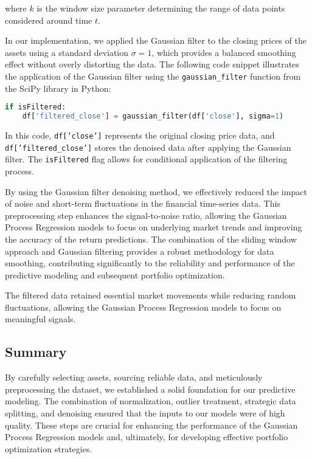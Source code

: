 where $k$ is the window size parameter determining the range of data points considered around time $t$.

In our implementation, we applied the Gaussian filter to the closing prices of the assets using a standard deviation $\sigma = 1$, which provides a balanced smoothing effect without overly distorting the data. The following code snippet illustrates the application of the Gaussian filter using the \texttt{gaussian\_filter} function from the SciPy library in Python:

\begin{lstlisting}[language=Python]
if isFiltered:
    df['filtered_close'] = gaussian_filter(df['close'], sigma=1)
\end{lstlisting}

In this code, \texttt{df['close']} represents the original closing price data, and \texttt{df['filtered\_close']} stores the denoised data after applying the Gaussian filter. The \texttt{isFiltered} flag allows for conditional application of the filtering process.

By using the Gaussian filter denoising method, we effectively reduced the impact of noise and short-term fluctuations in the financial time-series data. This preprocessing step enhances the signal-to-noise ratio, allowing the Gaussian Process Regression models to focus on underlying market trends and improving the accuracy of the return predictions. The combination of the sliding window approach and Gaussian filtering provides a robust methodology for data smoothing, contributing significantly to the reliability and performance of the predictive modeling and subsequent portfolio optimization.

The filtered data retained essential market movements while reducing random fluctuations, allowing the Gaussian Process Regression models to focus on meaningful signals.


\subsection{Summary}

By carefully selecting assets, sourcing reliable data, and meticulously preprocessing the dataset, we established a solid foundation for our predictive modeling. The combination of normalization, outlier treatment, strategic data splitting, and denoising ensured that the inputs to our models were of high quality. These steps are crucial for enhancing the performance of the Gaussian Process Regression models and, ultimately, for developing effective portfolio optimization strategies.



